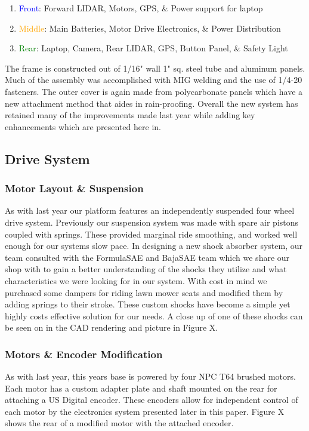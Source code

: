 \begin{enumerate}
\item \textcolor{blue}{Front}: Forward LIDAR, Motors, GPS, \& Power support for laptop
\item \textcolor{Orange}{Middle}: Main Batteries, Motor Drive Electronics, \& Power Distribution
\item \textcolor{green}{Rear}: Laptop, Camera, Rear LIDAR, GPS, Button Panel, \& Safety Light
\end{enumerate}

The frame is constructed out of 1/16" wall 1" sq. steel tube and aluminum panels. Much of the assembly was accomplished with MIG welding and the use of 1/4-20 fasteners. The outer cover is again made from polycarbonate panels which have a new attachment method that aides in rain-proofing. Overall the new system has retained many of the improvements made last year while adding key enhancements which are presented here in. 

\subsection{Drive System}
\subsubsection{Motor Layout \& Suspension}
As with last year our platform features an independently suspended four wheel drive system. Previously our suspension system was made with spare air pistons coupled with springs. These provided marginal ride smoothing, and worked well enough for our systems slow pace. In designing a new shock absorber system, our team consulted with the FormulaSAE and BajaSAE team which we share our shop with to gain a better understanding of the shocks they utilize and what characteristics we were looking for in our system. With cost in mind we purchased some dampers for riding lawn mower seats and modified them by adding springs to their stroke. These custom shocks have become a simple yet highly costs effective solution for our needs. A close up of one of these shocks can be seen on in the CAD rendering and picture in Figure X.

\subsubsection{Motors \& Encoder Modification}
As with last year, this years base is powered by four NPC T64 brushed motors. Each motor has a custom adapter plate and shaft mounted on the rear for attaching a US Digital encoder. These encoders allow for independent control of each motor by the electronics system presented later in this paper. Figure X shows the rear of a modified motor with the attached encoder.

